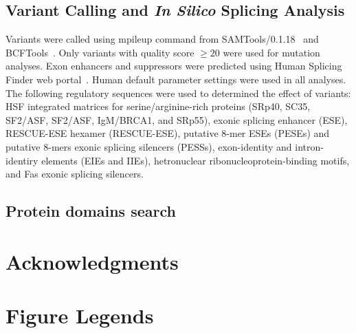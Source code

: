\documentclass[10pt]{article}
\begin{document}
\subsection{Variant Calling and \textit{In Silico} Splicing Analysis}
Variants were called using mpileup command from SAMTools/0.1.18~\cite{} and BCFTools~\cite{}.
Only variants with quality score $\ge20$ were used for mutation analyses.
Exon enhancers and suppressors were predicted using Human Splicing Finder web portal~\cite{}.
Human default parameter settings were used in all analyses.
The following regulatory sequences were used to determined the effect of variants:
HSF integrated matrices for serine/arginine-rich proteins (SRp40, SC35, SF2/ASF, SF2/ASF,
IgM/BRCA1, and SRp55), exonic splicing enhancer (ESE), RESCUE-ESE hexamer (RESCUE-ESE),
putative 8-mer ESEs (PESEs) and putative 8-mers exonic splicing silencers (PESSs),
exon-identity and intron-identiry elements (EIEs and IIEs), hetronuclear ribonucleoprotein-binding
motifs, and Fas exonic splicing silencers.

\subsection{Protein domains search}

\section*{Acknowledgments}

{}

\section*{Figure Legends}
\end{document}

